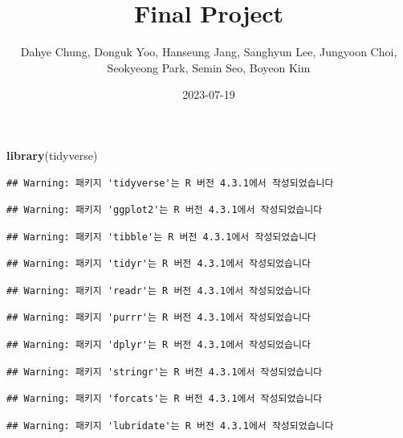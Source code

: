 \documentclass[
  11pt,
]{article}
\title{Final Project}
\author{Dahye Chung, Donguk Yoo, Hanseung Jang, Sanghyun Lee, Jungyoon
Choi, Seokyeong Park, Semin Seo, Boyeon Kim}
\date{2023-07-19}
\newenvironment{Shaded}{\begin{snugshade}}{\end{snugshade}}
\newcommand{\FunctionTok}[1]{\textcolor[rgb]{0.13,0.29,0.53}{\textbf{#1}}}
\newcommand{\NormalTok}[1]{#1}
\begin{document}
\maketitle

\begin{Shaded}
\begin{Highlighting}[]
\FunctionTok{library}\NormalTok{(tidyverse)}
\end{Highlighting}
\end{Shaded}

\begin{verbatim}
## Warning: 패키지 'tidyverse'는 R 버전 4.3.1에서 작성되었습니다
\end{verbatim}

\begin{verbatim}
## Warning: 패키지 'ggplot2'는 R 버전 4.3.1에서 작성되었습니다
\end{verbatim}

\begin{verbatim}
## Warning: 패키지 'tibble'는 R 버전 4.3.1에서 작성되었습니다
\end{verbatim}

\begin{verbatim}
## Warning: 패키지 'tidyr'는 R 버전 4.3.1에서 작성되었습니다
\end{verbatim}

\begin{verbatim}
## Warning: 패키지 'readr'는 R 버전 4.3.1에서 작성되었습니다
\end{verbatim}

\begin{verbatim}
## Warning: 패키지 'purrr'는 R 버전 4.3.1에서 작성되었습니다
\end{verbatim}

\begin{verbatim}
## Warning: 패키지 'dplyr'는 R 버전 4.3.1에서 작성되었습니다
\end{verbatim}

\begin{verbatim}
## Warning: 패키지 'stringr'는 R 버전 4.3.1에서 작성되었습니다
\end{verbatim}

\begin{verbatim}
## Warning: 패키지 'forcats'는 R 버전 4.3.1에서 작성되었습니다
\end{verbatim}

\begin{verbatim}
## Warning: 패키지 'lubridate'는 R 버전 4.3.1에서 작성되었습니다
\end{verbatim}
\end{document}
